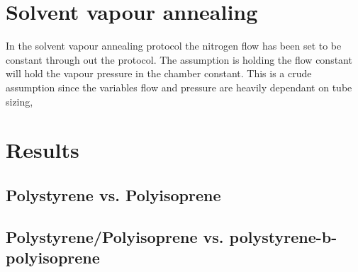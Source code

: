 \documentclass[MasterThesisMain.tex]{subfiles}
\begin{document}
\section{Solvent vapour annealing}

In the solvent vapour annealing protocol the nitrogen flow has been set to be constant through out the protocol. The assumption is holding the flow constant will hold the vapour pressure in the chamber constant. This is a crude assumption since the variables flow and pressure are heavily dependant on tube sizing,  

\section{Results}

\subsection{Polystyrene vs. Polyisoprene}

\subsection{Polystyrene/Polyisoprene vs. polystyrene-b-polyisoprene}
\end{document}
